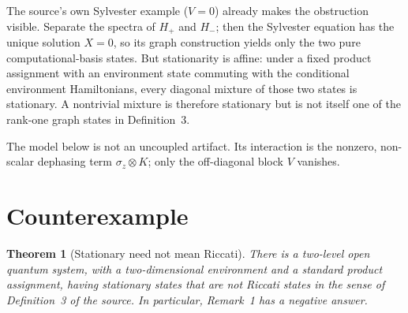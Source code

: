 \documentclass[11pt]{article}
\newtheorem{theorem}{Theorem}
\begin{document}
The source's own Sylvester example ($V=0$) already makes the obstruction
visible. Separate the spectra of $H_+$ and $H_-$; then the Sylvester equation
has the unique solution $X=0$, so its graph construction yields only the two
pure computational-basis states. But stationarity is affine: under a fixed
product assignment with an environment state commuting with the conditional
environment Hamiltonians, every diagonal mixture of those two states is
stationary. A nontrivial mixture is therefore stationary but is not itself one
of the rank-one graph states in Definition~3.

The model below is not an uncoupled artifact. Its interaction is the nonzero,
non-scalar dephasing term $\sigma_z\otimes K$; only the off-diagonal block $V$
vanishes.

\section{Counterexample}

\begin{theorem}[Stationary need not mean Riccati]
There is a two-level open quantum system, with a two-dimensional environment
and a standard product assignment, having stationary states that are not
Riccati states in the sense of Definition~3 of the source. In particular,
Remark~1 has a negative answer.
\end{theorem}
\end{document}
